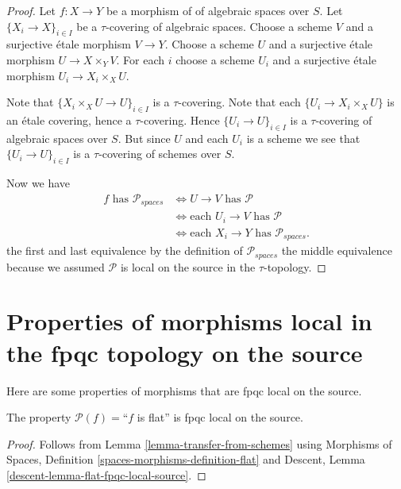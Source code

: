 \begin{proof}
Let $f : X \to Y$ be a morphism of of algebraic spaces over $S$.
Let $\{X_i \to X\}_{i \in I}$ be a $\tau$-covering of algebraic spaces.
Choose a scheme $V$ and a surjective \'etale morphism $V \to Y$.
Choose a scheme $U$ and a surjective \'etale morphism $U \to X \times_Y V$.
For each $i$ choose a scheme $U_i$ and a surjective \'etale morphism
$U_i \to X_i \times_X U$.

\medskip\noindent
Note that $\{X_i \times_X U \to U\}_{i \in I}$ is a $\tau$-covering.
Note that each $\{U_i \to X_i \times_X U\}$ is an \'etale covering,
hence a $\tau$-covering. Hence $\{U_i \to U\}_{i \in I}$ is a
$\tau$-covering of algebraic spaces over $S$. But since $U$ and each $U_i$
is a scheme we see that $\{U_i \to U\}_{i \in I}$ is a
$\tau$-covering of schemes over $S$.

\medskip\noindent
Now we have
\begin{align*}
f \text{ has }\mathcal{P}_{spaces}
& \Leftrightarrow
U \to V \text{ has }\mathcal{P} \\
& \Leftrightarrow
\text{each }U_i \to V \text{ has }\mathcal{P} \\
& \Leftrightarrow
\text{each }X_i \to Y\text{ has }\mathcal{P}_{spaces}.
\end{align*}
the first and last equivalence by the definition of
$\mathcal{P}_{spaces}$ the middle equivalence because we assumed
$\mathcal{P}$ is local on the source in the $\tau$-topology.
\end{proof}






\section{Properties of morphisms local in the fpqc topology on the source}
\label{section-fpqc-local-source}

\noindent
Here are some properties of morphisms that are fpqc local on the source.

\begin{lemma}
\label{lemma-flat-fpqc-local-source}
The property $\mathcal{P}(f)=$``$f$ is flat'' is fpqc local on the source.
\end{lemma}

\begin{proof}
Follows from
Lemma \ref{lemma-transfer-from-schemes}
using
Morphisms of Spaces, Definition \ref{spaces-morphisms-definition-flat}
and
Descent, Lemma \ref{descent-lemma-flat-fpqc-local-source}.
\end{proof}










